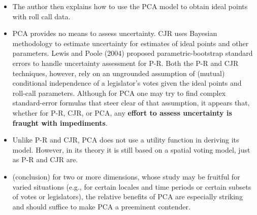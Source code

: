 \documentclass[a4paper,12pt]{article}
\begin{document}
\begin{enumerate}
\begin{itemize}
\item The author then explains how to use the PCA model to obtain ideal points with roll call data.  
\item PCA provides no means to assess uncertainty. CJR uses Bayesian methodology to estimate uncertainty for estimates of ideal points and other parameters. Lewis and Poole (2004) proposed parametric-bootstrap standard errors to handle uncertainty assessment for P-R. Both the P-R and CJR techniques, however, rely on an ungrounded assumption of (mutual) conditional independence of a legislator’s votes given the ideal points and roll-call parameters. Although for PCA one may try to find complex standard-error formulas that steer clear of that assumption, it appears that, whether for P-R, CJR, or PCA, any \textbf{effort to assess uncertainty is fraught with impediments}. 
\item Unlike P-R and CJR, PCA does not use a utility function in deriving its model. However, in its theory it is still based on a spatial voting model, just as P-R and CJR are. 
\item (conclusion) for two or more dimensions, whose study may be fruitful for varied situations (e.g., for certain locales and time periods or certain subsets of votes or legislators), the relative benefits of PCA are especially striking and should suffice to make PCA a preeminent contender. 

\end{itemize}



\newpage





\end{enumerate}
\end{document}
